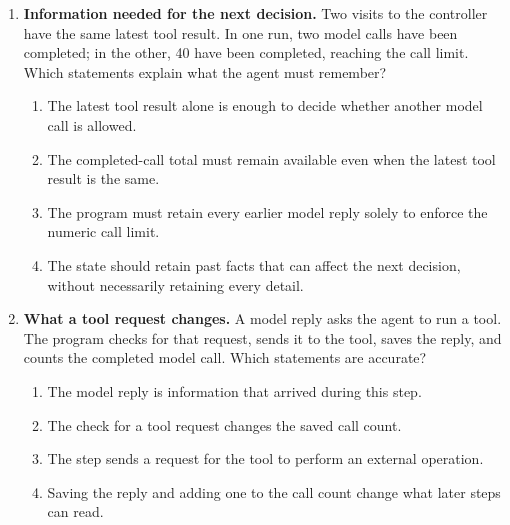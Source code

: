 \begin{enumerate}[start=1,itemsep=0.7\baselineskip]
\item\label{exercise:5} \begin{minipage}[t]{\linewidth}
\textbf{Information needed for the next decision.} Two visits to the controller have the same latest tool result. In one run, two model calls have been completed; in the other, 40 have been completed, reaching the call limit. Which statements explain what the agent must remember?
\begin{enumerate}[label=\textnormal{(\Alph*)},leftmargin=*,itemsep=0pt]
\item The latest tool result alone is enough to decide whether another model call is allowed.
\item The completed-call total must remain available even when the latest tool result is the same.
\item The program must retain every earlier model reply solely to enforce the numeric call limit.
\item The state should retain past facts that can affect the next decision, without necessarily retaining every detail.
\end{enumerate}
\end{minipage}

\item\label{exercise:6} \begin{minipage}[t]{\linewidth}
\textbf{What a tool request changes.} A model reply asks the agent to run a tool. The program checks for that request, sends it to the tool, saves the reply, and counts the completed model call. Which statements are accurate?
\begin{enumerate}[label=\textnormal{(\Alph*)},leftmargin=*,itemsep=0pt]
\item The model reply is information that arrived during this step.
\item The check for a tool request changes the saved call count.
\item The step sends a request for the tool to perform an external operation.
\item Saving the reply and adding one to the call count change what later steps can read.
\end{enumerate}
\end{minipage}


\end{enumerate}
